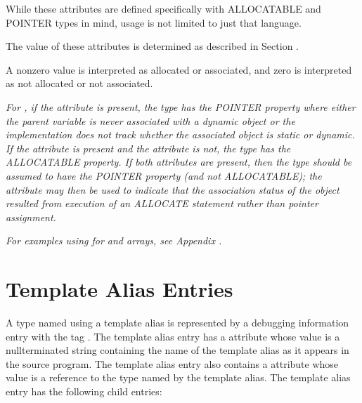 While these attributes are defined specifically with 
 ALLOCATABLE and POINTER types
in mind, usage is not limited
to just that language.

The value of these attributes is determined as described in
Section .

A non\dash zero value is interpreted as allocated or associated,
and zero is interpreted as not allocated or not associated.

\textit{For , 
if the  
attribute is present,
the type has the POINTER property where either the parent
variable is never associated with a dynamic object or the
implementation does not track whether the associated object
is static or dynamic. If the  attribute is
present and the  attribute is not, the type
has the ALLOCATABLE property. If both attributes are present,
then the type should be assumed to have the POINTER property
(and not ALLOCATABLE); the  attribute may then
be used to indicate that the association status of the object
resulted from execution of an ALLOCATE statement rather than
pointer assignment.}

\textit{For examples using 
 for  and 
arrays, 
see Appendix .}



\section{Template Alias Entries}
\label{chap:templatealiasentries}

A type named using a template alias is represented
by a debugging information entry 
with the tag
. 
The template alias entry has a
 attribute 
whose value is a null\dash terminated string
containing the name of the template alias as it appears in
the source program. The template alias entry also contains 
a
 attribute 
whose value is a reference to the type
named by the template alias. The template alias entry has
the following child entries:


